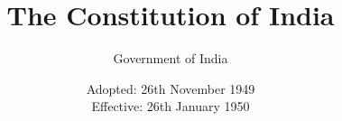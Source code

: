 \documentclass[a4paper,12pt,showamendments,globalfootnotes]{soi}
\title{The Constitution of India}
\author{Government of India}
\date{Adopted: 26th November 1949 \\ Effective: 26th January 1950}
\begin{document}
\soifrontcover
\soitableofcontents
\soipreamble






















\soibackcover
\end{document}
